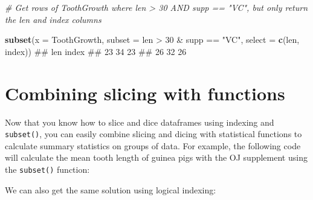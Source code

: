\documentclass[]{book}
\newenvironment{Shaded}{\begin{snugshade}}{\end{snugshade}}
\newcommand{\KeywordTok}[1]{\textcolor[rgb]{0.13,0.29,0.53}{\textbf{{#1}}}}
\newcommand{\DataTypeTok}[1]{\textcolor[rgb]{0.13,0.29,0.53}{{#1}}}
\newcommand{\DecValTok}[1]{\textcolor[rgb]{0.00,0.00,0.81}{{#1}}}
\newcommand{\StringTok}[1]{\textcolor[rgb]{0.31,0.60,0.02}{{#1}}}
\newcommand{\CommentTok}[1]{\textcolor[rgb]{0.56,0.35,0.01}{\textit{{#1}}}}
\newcommand{\NormalTok}[1]{{#1}}
\theoremstyle{definition}
\theoremstyle{definition}
\theoremstyle{remark}
\begin{document}
\begin{Shaded}
\begin{Highlighting}[]
\CommentTok{# Get rows of ToothGrowth where len > 30 AND supp == "VC", but only return the len and index columns}

\KeywordTok{subset}\NormalTok{(}\DataTypeTok{x =} \NormalTok{ToothGrowth,}
      \DataTypeTok{subset =} \NormalTok{len >}\StringTok{ }\DecValTok{30} \NormalTok{&}
\StringTok{               }\NormalTok{supp ==}\StringTok{ "VC"}\NormalTok{,}
      \DataTypeTok{select =} \KeywordTok{c}\NormalTok{(len, index))}
\NormalTok{##    len index}
\NormalTok{## 23  34    23}
\NormalTok{## 26  32    26}
\end{Highlighting}
\end{Shaded}

\section{Combining slicing with
functions}\label{combining-slicing-with-functions}

Now that you know how to slice and dice dataframes using indexing and
\texttt{subset()}, you can easily combine slicing and dicing with
statistical functions to calculate summary statistics on groups of data.
For example, the following code will calculate the mean tooth length of
guinea pigs with the OJ supplement using the \texttt{subset()} function:

\begin{Shaded}
\end{Shaded}

We can also get the same solution using logical indexing:

\begin{Shaded}
\end{Shaded}
\end{document}
